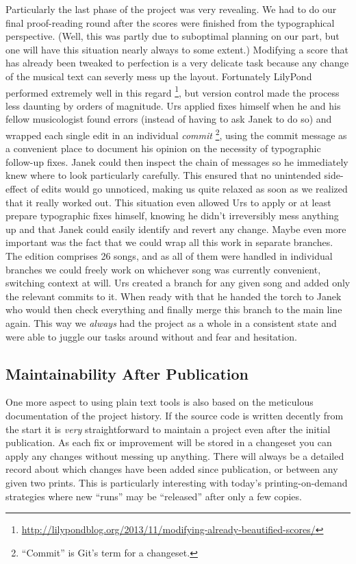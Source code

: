\documentclass[11pt,a4paper]{article}
\begin{document}
Particularly the last phase of the project was very revealing. We had to do our final
proof-reading round after the scores were finished from the typographical perspective.
(Well, this was partly due to suboptimal planning on our part, but one will have this
situation nearly always to some extent.) Modifying a score that has already been tweaked
to perfection is a very delicate task because any change of the musical text can
severly mess up the layout. Fortunately LilyPond performed extremely well in this regard%
\footnote{\url{http://lilypondblog.org/2013/11/modifying-already-beautified-scores/}},
but version control made the process less daunting by orders of magnitude.
Urs applied fixes  himself when he and his fellow musicologist found errors (instead
of having to ask Janek to do so) and wrapped each single edit in an individual \emph{commit}%
\footnote{“Commit” is Git's term for a changeset.},
using the commit message as a convenient place to document his opinion on the necessity of
typographic follow-up fixes. Janek could then inspect the chain of messages so he
immediately knew where to look particularly carefully. This ensured that no unintended
side-effect of edits would go unnoticed, making us quite relaxed as soon as we realized
that it really worked out. This situation even allowed Urs to apply or at least prepare
typographic fixes himself, knowing he didn't irreversibly mess anything up and that Janek
could easily identify and revert any change.
Maybe even more important was the fact that we could wrap all this work in separate branches.
The edition comprises 26 songs, and as all of them were handled in individual branches
we could freely work on whichever song was currently convenient, switching context at
will. Urs created a branch for any given song and added only the relevant commits to it.
When ready with that he handed the torch to Janek who would then check everything and
finally merge this branch to the main line again. This way we \emph{always} had the project
as a whole in a consistent state and were able to juggle our tasks around without and fear
and hesitation.

\subsection{Maintainability After Publication}
One more aspect to using plain text tools is also based on the meticulous documentation
of the project history. If the source code is written decently from the start it is
\emph{very} straightforward to maintain a project even after the initial publication.
As each fix or improvement will be stored in a changeset you can apply any changes
without messing up anything. There will always be a detailed record about which
changes have been added since publication, or between any given two prints. This is
particularly interesting with today's printing-on-demand strategies where new “runs”
may be “released” after only a few copies.
\end{document}
